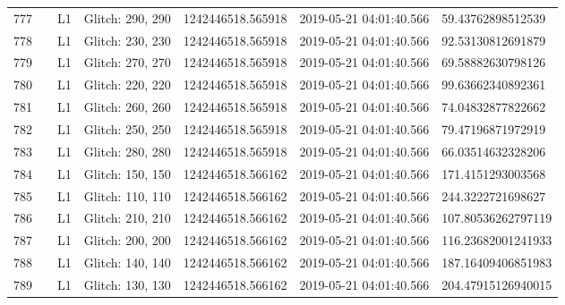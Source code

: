 \begin{longtable}{lllllll}
777  &                                                    &       L1 &  Glitch: 290, 290 &   1242446518.565918 &  2019-05-21 04:01:40.566 &   59.43762898512539 \\
778  &                                                    &       L1 &  Glitch: 230, 230 &   1242446518.565918 &  2019-05-21 04:01:40.566 &   92.53130812691879 \\
779  &                                                    &       L1 &  Glitch: 270, 270 &   1242446518.565918 &  2019-05-21 04:01:40.566 &   69.58882630798126 \\
780  &                                                    &       L1 &  Glitch: 220, 220 &   1242446518.565918 &  2019-05-21 04:01:40.566 &   99.63662340892361 \\
781  &                                                    &       L1 &  Glitch: 260, 260 &   1242446518.565918 &  2019-05-21 04:01:40.566 &   74.04832877822662 \\
782  &                                                    &       L1 &  Glitch: 250, 250 &   1242446518.565918 &  2019-05-21 04:01:40.566 &   79.47196871972919 \\
783  &                                                    &       L1 &  Glitch: 280, 280 &   1242446518.565918 &  2019-05-21 04:01:40.566 &   66.03514632328206 \\
784  &                                                    &       L1 &  Glitch: 150, 150 &   1242446518.566162 &  2019-05-21 04:01:40.566 &   171.4151293003568 \\
785  &                                                    &       L1 &  Glitch: 110, 110 &   1242446518.566162 &  2019-05-21 04:01:40.566 &   244.3222721698627 \\
786  &                                                    &       L1 &  Glitch: 210, 210 &   1242446518.566162 &  2019-05-21 04:01:40.566 &  107.80536262797119 \\
787  &                                                    &       L1 &  Glitch: 200, 200 &   1242446518.566162 &  2019-05-21 04:01:40.566 &  116.23682001241933 \\
788  &                                                    &       L1 &  Glitch: 140, 140 &   1242446518.566162 &  2019-05-21 04:01:40.566 &  187.16409406851983 \\
789  &                                                    &       L1 &  Glitch: 130, 130 &   1242446518.566162 &  2019-05-21 04:01:40.566 &  204.47915126940015 \\

\end{longtable}
